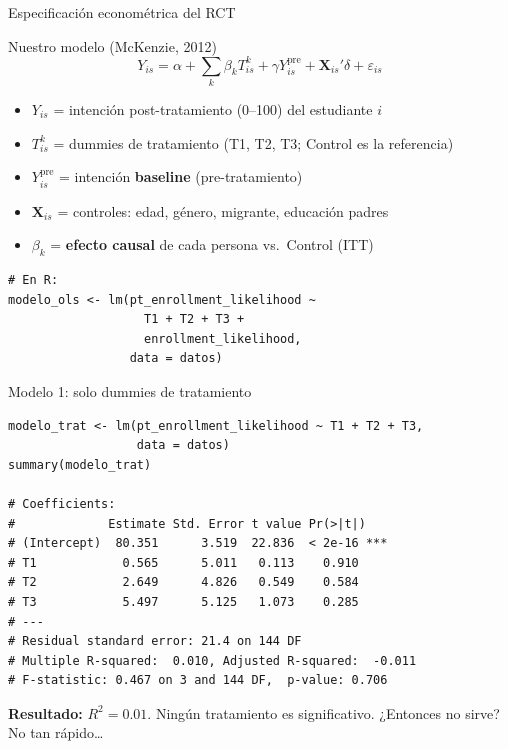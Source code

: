 \documentclass[aspectratio=169, 11pt]{beamer}
\begin{document}
\begin{frame}[fragile]{Especificación econométrica del RCT}
\begin{block}{Nuestro modelo (McKenzie, 2012)}
\[
Y_{is} = \alpha + \sum_{k} \beta_k T_{is}^k + \gamma Y_{is}^{\text{pre}} + \mathbf{X}_{is}'\delta + \varepsilon_{is}
\]
\begin{itemize}\setlength{\itemsep}{1pt}
  \item $Y_{is}$ = intención post-tratamiento (0--100) del estudiante $i$
  \item $T_{is}^k$ = dummies de tratamiento (T1, T2, T3; Control es la referencia)
  \item $Y_{is}^{\text{pre}}$ = intención \textbf{baseline} (pre-tratamiento)
  \item $\mathbf{X}_{is}$ = controles: edad, género, migrante, educación padres
  \item $\beta_k$ = \textbf{efecto causal} de cada persona vs.\ Control (ITT)
\end{itemize}
\end{block}

\begin{lstlisting}[basicstyle=\ttfamily\scriptsize]
# En R:
modelo_ols <- lm(pt_enrollment_likelihood ~
                   T1 + T2 + T3 +
                   enrollment_likelihood,
                 data = datos)
\end{lstlisting}
\end{frame}

\begin{frame}[fragile]{Modelo 1: solo dummies de tratamiento}
\begin{lstlisting}[basicstyle=\ttfamily\scriptsize]
modelo_trat <- lm(pt_enrollment_likelihood ~ T1 + T2 + T3,
                  data = datos)
summary(modelo_trat)

# Coefficients:
#             Estimate Std. Error t value Pr(>|t|)
# (Intercept)  80.351      3.519  22.836  < 2e-16 ***
# T1            0.565      5.011   0.113    0.910
# T2            2.649      4.826   0.549    0.584
# T3            5.497      5.125   1.073    0.285
# ---
# Residual standard error: 21.4 on 144 DF
# Multiple R-squared:  0.010, Adjusted R-squared:  -0.011
# F-statistic: 0.467 on 3 and 144 DF,  p-value: 0.706
\end{lstlisting}

\vspace{0.1cm}
{\small \textbf{Resultado:} $R^2 = 0.01$. Ningún tratamiento es significativo. ¿Entonces no sirve? No tan rápido\ldots}
\end{frame}
\end{document}
